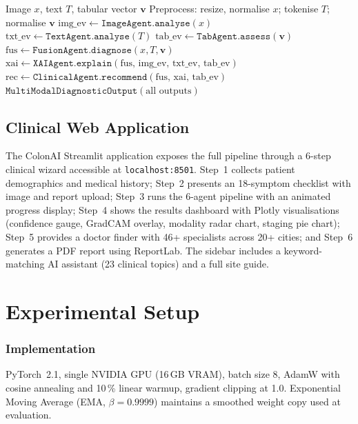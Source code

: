 \documentclass[conference]{IEEEtran}
\begin{document}
\begin{algorithm}[t]
\caption{ColonAI Inference Pipeline}
\begin{algorithmic}[1]
\REQUIRE Image $x$, text $T$, tabular vector $\mathbf{v}$
\STATE Preprocess: resize, normalise $x$; tokenise $T$; normalise $\mathbf{v}$
\STATE $\text{img\_ev} \leftarrow \texttt{ImageAgent.analyse}(x)$
\STATE $\text{txt\_ev} \leftarrow \texttt{TextAgent.analyse}(T)$
\STATE $\text{tab\_ev} \leftarrow \texttt{TabAgent.assess}(\mathbf{v})$
\STATE $\text{fus} \leftarrow \texttt{FusionAgent.diagnose}(x, T, \mathbf{v})$
\STATE $\text{xai} \leftarrow \texttt{XAIAgent.explain}(\text{fus, img\_ev, txt\_ev, tab\_ev})$
\STATE $\text{rec} \leftarrow \texttt{ClinicalAgent.recommend}(\text{fus, xai, tab\_ev})$
\RETURN $\texttt{MultiModalDiagnosticOutput}(\text{all outputs})$
\end{algorithmic}
\end{algorithm}

\subsection{Clinical Web Application}

The ColonAI Streamlit application exposes the full pipeline through a
6-step clinical wizard accessible at \texttt{localhost:8501}. Step~1
collects patient demographics and medical history; Step~2 presents an
18-symptom checklist with image and report upload; Step~3 runs the
6-agent pipeline with an animated progress display; Step~4 shows the
results dashboard with Plotly visualisations (confidence gauge, GradCAM
overlay, modality radar chart, staging pie chart); Step~5 provides a
doctor finder with 46+ specialists across 20+ cities; and Step~6 generates
a PDF report using ReportLab. The sidebar includes a keyword-matching
AI assistant (23 clinical topics) and a full site guide.

\section{Experimental Setup}

\subsubsection*{Implementation}
PyTorch~2.1, single NVIDIA GPU (16\,GB VRAM), batch size 8, AdamW with
cosine annealing and 10\,\% linear warmup, gradient clipping at 1.0.
Exponential Moving Average (EMA, $\beta\!=\!0.9999$) maintains a smoothed
weight copy used at evaluation.
\end{document}
